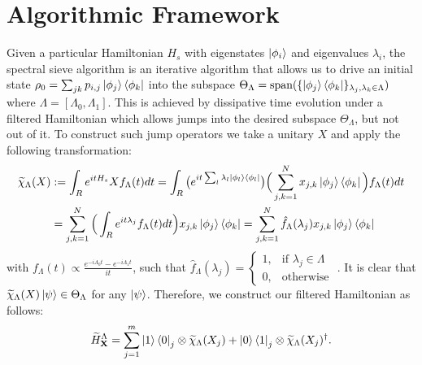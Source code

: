 \documentclass[10pt]{amsart}
\newcommand{\X}{\textbf{X}}
\newcommand{\dm}[2]{\left|#1\right\rangle\left\langle#2\right|}
\begin{document}

\newpage

\section{Algorithmic Framework}
Given a particular Hamiltonian $H_s$ with eigenstates $\ket{\phi_i}$ and eigenvalues $\lambda_i$, the spectral sieve algorithm is an iterative algorithm that allows us to drive an initial state $\rho_0 = \sum_{jk} p_{i,j} \ket{ \phi_j }\bra{\phi_k}$ into the subspace $\Theta_{\Lambda} = \text{span}(\{ \ket{\phi_j}\bra{\phi_k} \}_{\lambda_j, \lambda_k \in \Lambda})$ where $\Lambda = [\Lambda_0, \Lambda_1]$. This is achieved by dissipative time evolution under a filtered Hamiltonian which allows jumps into the desired subspace $\Theta_{\Lambda}$, but not out of it. To construct such jump operators we take a unitary $X$ and apply the following transformation:
\begin{align}
\begin{split}
    \label{eq_chi}
    \widetilde{\chi}_{\Lambda} (X) &:= \int_R e^{itH_s} X f_{\Lambda}(t)dt 
    =\int_R \big(e^{it\sum_l\lambda_l \ket{\phi_l}\bra{\phi_l}} \big) \Big(\sum_{j,k=1}^Nx_{j,k}\ket{\phi_j}\bra{\phi_k} \Big) f_{\Lambda}(t)dt\\
    &= \sum_{j,k=1}^N \Big(\int_R e^{it\lambda_j } f_{\Lambda}(t)dt \Big) x_{j,k}\ket{\phi_j}\bra{\phi_k} 
    = \sum_{j,k=1}^{N} \hat{f}_{\Lambda}({\lambda_j})x_{j,k} \dm{\phi_j}{\phi_k}
    \end{split}
\end{align}
with $f_{\Lambda}(t) \propto \frac{e^{-i \Lambda_0 t} - e^{-i \Lambda_1 t} }{it}$, such that 
$\hat{f}_{\Lambda}(\lambda_j) =  \begin{cases} 1, & \text{if } \lambda_j \in \Lambda \\ 0, & \text{otherwise } \end{cases}$. It is clear that $\widetilde{\chi}_{\Lambda} (X) \ket{\psi} \in \Theta_{\Lambda}$ for any $\ket{\psi}$. Therefore, we construct our filtered Hamiltonian as follows:
\begin{equation}
    \label{eq_H}
    \widetilde{H}^{\Lambda}_{\X} = \sum_{j=1}^m \ket{1}\bra{0}_j \otimes \widetilde{\chi}_{\Lambda}(X_j) + \ket{0}\bra{1}_j \otimes \widetilde{\chi}_{\Lambda}(X_j)^{\dagger}.
\end{equation}
\end{document}
